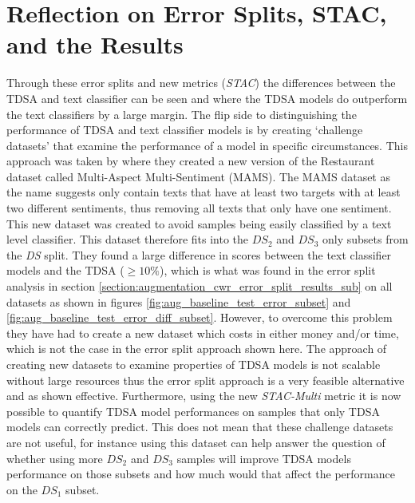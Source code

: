 \section{Reflection on Error Splits, STAC, and the Results}
Through these error splits and new metrics (\textit{STAC}) the differences between the TDSA and text classifier can be seen and where the TDSA models do outperform the text classifiers by a large margin. The flip side to distinguishing the performance of TDSA and text classifier models is by creating `challenge datasets' that examine the performance of a model in specific circumstances. This approach was taken by \citet{jiang-etal-2019-challenge} where they created a new version of the Restaurant dataset called Multi-Aspect Multi-Sentiment (MAMS). The MAMS dataset as the name suggests only contain texts that have at least two targets with at least two different sentiments, thus removing all texts that only have one sentiment. This new dataset was created to avoid samples being easily classified by a text level classifier. This dataset therefore fits into the $DS_2$ and $DS_3$ only subsets from the \textit{DS} split. They found a large difference in scores between the text classifier models and the TDSA ($\geq 10\%$), which is what was found in the error split analysis in section \ref{section:augmentation_cwr_error_split_results_sub} on all datasets as shown in figures \ref{fig:aug_baseline_test_error_subset} and \ref{fig:aug_baseline_test_error_diff_subset}. However, to overcome this problem they have had to create a new dataset which costs in either money and/or time, which is not the case in the error split approach shown here. The approach of creating new datasets to examine properties of TDSA models is not scalable without large resources thus the error split approach is a very feasible alternative and as shown effective. Furthermore, using the new \textit{STAC-Multi} metric it is now possible to quantify TDSA model performances on samples that only TDSA models can correctly predict. This does not mean that these challenge datasets are not useful, for instance using this dataset can help answer the question of whether using more $DS_2$ and $DS_3$ samples will improve TDSA models performance on those subsets and how much would that affect the performance on the $DS_1$ subset.

